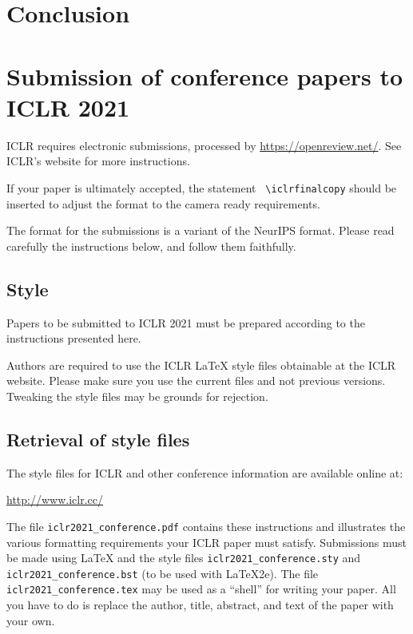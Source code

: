 \documentclass{article} %
\begin{document}
\section{Conclusion}






\iffalse
\section{Submission of conference papers to ICLR 2021}

ICLR requires electronic submissions, processed by
\url{https://openreview.net/}. See ICLR's website for more instructions.

If your paper is ultimately accepted, the statement {\tt
  {\textbackslash}iclrfinalcopy} should be inserted to adjust the
format to the camera ready requirements.

The format for the submissions is a variant of the NeurIPS format.
Please read carefully the instructions below, and follow them
faithfully.

\subsection{Style}

Papers to be submitted to ICLR 2021 must be prepared according to the
instructions presented here.


Authors are required to use the ICLR \LaTeX{} style files obtainable at the
ICLR website. Please make sure you use the current files and
not previous versions. Tweaking the style files may be grounds for rejection.

\subsection{Retrieval of style files}

The style files for ICLR and other conference information are available online at:
\begin{center}
   \url{http://www.iclr.cc/}
\end{center}
The file \verb+iclr2021_conference.pdf+ contains these
instructions and illustrates the
various formatting requirements your ICLR paper must satisfy.
Submissions must be made using \LaTeX{} and the style files
\verb+iclr2021_conference.sty+ and \verb+iclr2021_conference.bst+ (to be used with \LaTeX{}2e). The file
\verb+iclr2021_conference.tex+ may be used as a ``shell'' for writing your paper. All you
have to do is replace the author, title, abstract, and text of the paper with
your own.
\end{document}
